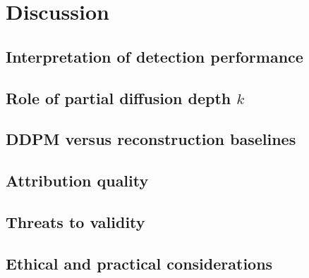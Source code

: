 \chapter{Discussion}
\label{ch:discussion}

\section{Interpretation of detection performance}

\section{Role of partial diffusion depth $k$}

\section{DDPM versus reconstruction baselines}

\section{Attribution quality}

\section{Threats to validity}

\section{Ethical and practical considerations}
